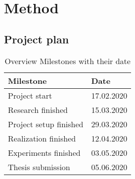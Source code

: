 \chapter{Method}
\label{ch:Method}

\section{Project plan}
\label{sec:Project-Plan}

\begin{table}[htbp]
    \centering
    \caption{Overview Milestones with their date}
	\label{tab:Milestones}
    \begin{tabular}{p{} | p{}}
        \toprule
        \textbf{Milestone} & \textbf{Date} \\ 
        \midrule[1pt]
        Project start & 17.02.2020\\
        \hline
        Research finished & 15.03.2020\\
        \hline
        Project setup finished & 29.03.2020\\
        \hline
        Realization finished & 12.04.2020\\
        \hline
        Experiments finished & 03.05.2020\\
        \hline
        Thesis submission & 05.06.2020\\
        \bottomrule
    \end{tabular}
\end{table}

\storeareas{}
{}
\storeareas\landscapevalues

